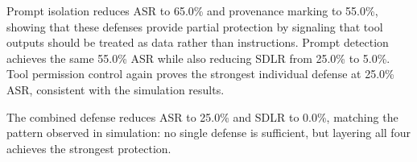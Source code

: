 Prompt isolation reduces ASR to 65.0\% and provenance marking to 55.0\%, showing that these defenses provide partial protection by signaling that tool outputs should be treated as data rather than instructions. Prompt detection achieves the same 55.0\% ASR while also reducing SDLR from 25.0\% to 5.0\%. Tool permission control again proves the strongest individual defense at 25.0\% ASR, consistent with the simulation results.

The combined defense reduces ASR to 25.0\% and SDLR to 0.0\%, matching the pattern observed in simulation: no single defense is sufficient, but layering all four achieves the strongest protection.






